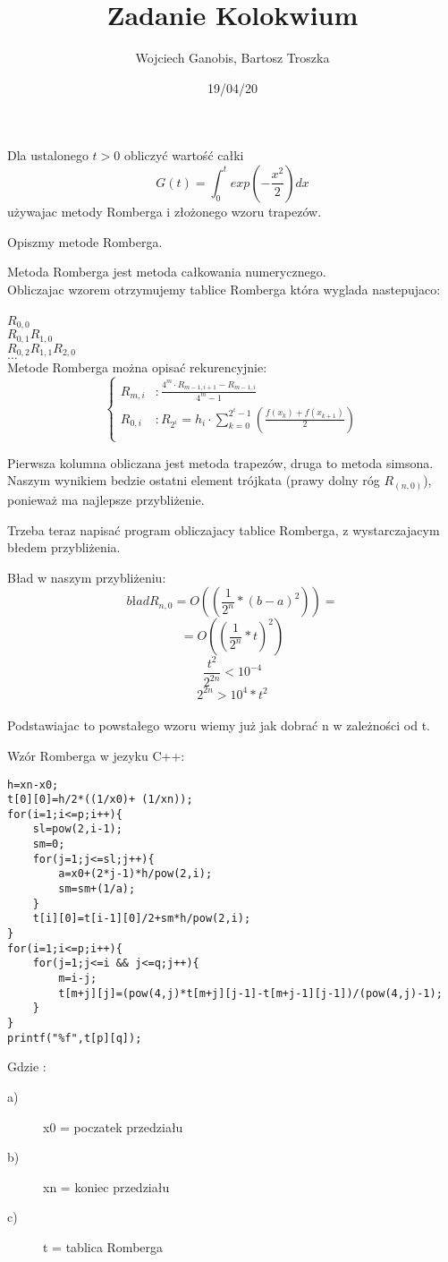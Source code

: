 \documentclass[12pt]{article}
\title{Zadanie Kolokwium}
\author{Wojciech Ganobis, Bartosz Troszka}
\date{19/04/20}
\begin{document}
\maketitle
Dla ustalonego $t > 0$ obliczyć wartość całki 
$$ G(t) = \int_0^{t} exp(-\frac{x^{2}}2  ) dx $$
 używajac metody Romberga i złożonego wzoru trapezów.

Opiszmy metode Romberga.

Metoda Romberga jest metoda całkowania numerycznego.\\
Obliczajac wzorem otrzymujemy tablice Romberga która wyglada nastepujaco:\\ \\
$R_{0, 0}$\\
$R_{0, 1} R_{1, 0}$\\
$R_{0, 2} R_{1, 1} R_{2, 0}$\\
$...$
\\
Metode Romberga można opisać rekurencyjnie:
\[ \begin{cases} 
      R_{m,i} &: \frac{4^m\cdot R_{m-1,i+1}-R_{m-1,i}}{4^m-1} \\
      R_{0,i} &: R_{2^i}=h_i\cdot \sum_{k=0}^{2^i-1}\left(\frac{f(x_k)+f(x_{k+1})}{2}\right) \\
   \end{cases}
\]

Pierwsza kolumna obliczana jest metoda trapezów, druga to metoda simsona.
Naszym wynikiem bedzie ostatni element trójkata (prawy dolny róg $R_(n, 0)$), ponieważ ma najlepsze przybliżenie.

Trzeba teraz napisać program obliczajacy tablice Romberga, z wystarczajacym błedem przybliżenia.

Bład w naszym przybliżeniu:\\
$$bład   R_{n, 0} = O((\frac{1}{2^{n}} * (b - a)^{2})) =$$
$$= O((\frac{1}{2^{n}} * t)^{2})$$
$$\frac{t^{2}}{2^{2n}} < 10^{-4} $$
$$ 2^{2n} > 10^{4} * t^{2}$$
\\
Podstawiajac to powstałego wzoru wiemy już jak dobrać n w zależności od t.

Wzór Romberga w jezyku C++:\\
\begin{lstlisting}
h=xn-x0;
t[0][0]=h/2*((1/x0)+ (1/xn));
for(i=1;i<=p;i++){
    sl=pow(2,i-1);
    sm=0;
    for(j=1;j<=sl;j++){
        a=x0+(2*j-1)*h/pow(2,i);
        sm=sm+(1/a);
    }
    t[i][0]=t[i-1][0]/2+sm*h/pow(2,i);
}
for(i=1;i<=p;i++){
    for(j=1;j<=i && j<=q;j++){
        m=i-j;
        t[m+j][j]=(pow(4,j)*t[m+j][j-1]-t[m+j-1][j-1])/(pow(4,j)-1);
    }
}
printf("%f",t[p][q]);
\end{lstlisting}
Gdzie :\\
\begin{description}
\item[a)] x0 = poczatek przedziału
\item[b)] xn = koniec przedziału
\item[c)] t = tablica Romberga
\end{description}
\end{document}
